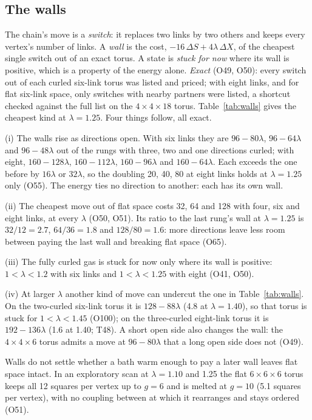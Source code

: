 \documentclass[aps,pre,10pt,twocolumn,superscriptaddress,nofootinbib]{revtex4-2}
\begin{document}
\subsection{The walls}

The chain's move is a \emph{switch}: it replaces two links by two others and keeps every vertex's number of links. A
\emph{wall} is the cost, $-16\,\Delta S + 4\lambda\,\Delta X$, of the cheapest single switch out of an exact torus. A
state is \emph{stuck for now} where its wall is positive, which is a property of the energy alone. \emph{Exact}
(O49, O50): every switch out of each curled six-link torus was listed and priced; with eight links, and for flat
six-link space, only switches with nearby partners were listed, a shortcut checked against the full list on the
$4 \times 4 \times 18$ torus. Table~\ref{tab:walls} gives the cheapest kind at $\lambda = 1.25$. Four things follow,
all exact.

(i) The walls rise as directions open. With six links they are $96 - 80\lambda$, $96 - 64\lambda$ and
$96 - 48\lambda$ out of the rungs with three, two and one directions curled; with eight, $160 - 128\lambda$,
$160 - 112\lambda$, $160 - 96\lambda$ and $160 - 64\lambda$. Each exceeds the one before by $16\lambda$ or
$32\lambda$, so the doubling 20, 40, 80 at eight links holds at $\lambda = 1.25$ only (O55). The energy ties no
direction to another: each has its own wall.

(ii) The cheapest move out of flat space costs 32, 64 and 128 with four, six and eight links, at every $\lambda$
(O50, O51). Its ratio to the last rung's wall at $\lambda = 1.25$ is $32/12 = 2.7$, $64/36 = 1.8$ and
$128/80 = 1.6$: more directions leave less room between paying the last wall and breaking flat space (O65).

(iii) The fully curled gas is stuck for now only where its wall is positive: $1 < \lambda < 1.2$ with six links and
$1 < \lambda < 1.25$ with eight (O41, O50).

(iv) At larger $\lambda$ another kind of move can undercut the one in Table~\ref{tab:walls}. On the two-curled
six-link torus it is $128 - 88\lambda$ (4.8 at $\lambda = 1.40$), so that torus is stuck for $1 < \lambda < 1.45$
(O100); on the three-curled eight-link torus it is $192 - 136\lambda$ (1.6 at 1.40; T48). A short open side also
changes the wall: the $4 \times 4 \times 6$ torus admits a move at $96 - 80\lambda$ that a long open side does not
(O49).

Walls do not settle whether a bath warm enough to pay a later wall leaves flat space intact. In an exploratory scan
at $\lambda = 1.10$ and 1.25 the flat $6 \times 6 \times 6$ torus keeps all 12 squares per vertex up to $g = 6$ and
is melted at $g = 10$ (5.1 squares per vertex), with no coupling between at which it rearranges and stays ordered
(O51).
\end{document}
